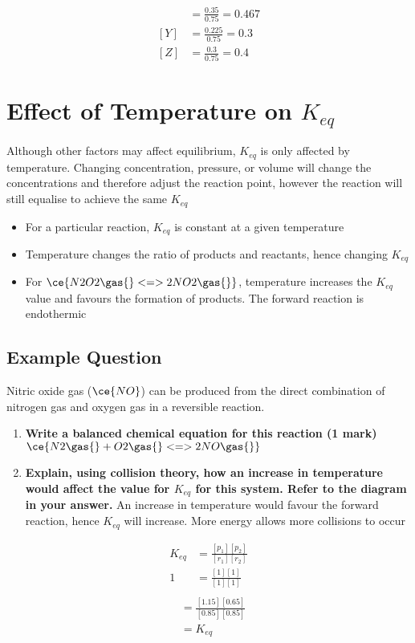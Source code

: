 	\begin{align*}
		[X] &= \frac{0.35}{0.75} = 0.467 \\
		[Y] &= \frac{0.225}{0.75} = 0.3 \\
		[Z] &= \frac{0.3}{0.75} = 0.4
	\end{align*}
	
\section{Effect of Temperature on $K_{eq}$} \label{8/11/2024}
	Although other factors may affect equilibrium, $K_{eq}$ is only affected by temperature.
	Changing concentration, pressure, or volume will change the concentrations and therefore adjust the reaction point, however the reaction will still equalise to achieve the same $K_{eq}$

	\begin{itemize}
		\item For a particular reaction, $K_{eq}$ is constant at a given temperature
		\item Temperature changes the ratio of products and reactants, hence changing $K_{eq}$
		\item For $\ce{N2O2 \gas{} <=> 2NO2 \gas{}}$, temperature increases the $K_{eq}$ value and favours the formation of products. The forward reaction is endothermic
	\end{itemize}

	\subsection{Example Question}
		Nitric oxide gas ($\ce{NO}$) can be produced from the direct combination of nitrogen gas and oxygen gas in a reversible reaction.
		\begin{enumerate}
			\item \textbf{Write a balanced chemical equation for this reaction (1 mark)}
				\subitem $\ce{N2 \gas{} + O2 \gas{} <=> 2NO \gas{}}$
			\item \textbf{Explain, using collision theory, how an increase in temperature would affect the value for $K_{eq}$ for this system. Refer to the diagram in your answer.}
				\subitem An increase in temperature would favour the forward reaction, hence $K_{eq}$ will increase. More energy allows more collisions to occur
		\end{enumerate}
	
		\begin{align*}
			K_{eq} &= \frac{[p_1][p_2]}{[r_1][r_2]} \\
			1 &= \frac{[1][1]}{[1][1]} \\
		\end{align*}
		\begin{align*}
			&= \frac{[1.15][0.65]}{[0.85][0.85]} \\
			&=K_{eq}
		\end{align*}

